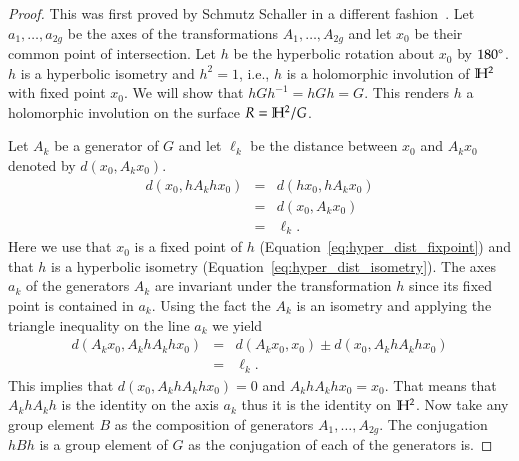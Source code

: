 \documentclass[Thesis]{subfiles}
\begin{document}
\begin{proof}
This was first proved by Schmutz Schaller in a different fashion~\cite{schmutz1999, schmutz2000}.
Let $a_1,\ldots,a_{2g}$ be the axes of the transformations $A_1,\ldots,A_{2g}$ and let $x_0$ be their common point of intersection. 
Let $h$ be the hyperbolic rotation about $x_0$ by $180\degree$. $h$ is a hyperbolic isometry and $h^2=1$, i.e., $h$ is a holomorphic involution of $\mathbb H^2$ with fixed point $x_0$. 
We will show that $hGh^{-1}=hGh=G$. 
This renders $h$ a holomorphic involution on the surface $R=\mathbb H^2/G$.

Let $A_k$ be a generator of $G$ and let $\ell_k$ be the distance between $x_0$ and $A_kx_0$ denoted by $d(x_0,A_kx_0)$.
\begin{eqnarray}
d(x_0,hA_khx_0)&=&d(hx_0,hA_kx_0)\label{eq:hyper_dist_fixpoint}\\
&=&d(x_0,A_kx_0)\label{eq:hyper_dist_isometry}\\
&=&\ell_k.
\end{eqnarray}
Here we use that $x_0$ is a fixed point of $h$ (Equation~\ref{eq:hyper_dist_fixpoint}) and that $h$ is a hyperbolic isometry (Equation~\ref{eq:hyper_dist_isometry}). 
The axes $a_k$ of the generators $A_k$ are invariant under the transformation $h$ since its fixed point is contained in $a_k$.
Using the fact the $A_k$ is an isometry and applying the triangle inequality on the line $a_k$ we yield
\begin{eqnarray*}
d(A_kx_0,A_khA_khx_0)&=&d(A_kx_0,x_0)\pm d(x_0,A_khA_khx_0)\\
&=&\ell_k.
\end{eqnarray*}
This implies that $d(x_0,A_khA_khx_0)=0$ and $A_khA_khx_0=x_0$.
That means that $A_khA_kh$ is the identity on the axis $a_k$ thus it is the identity on $\mathbb H^2$. 
Now take any group element $B$ as the composition of generators $A_1,\dots,A_{2g}$. 
The conjugation $hBh$ is a group element of $G$ as the conjugation of each of the generators is.


\end{proof}
\end{document}
